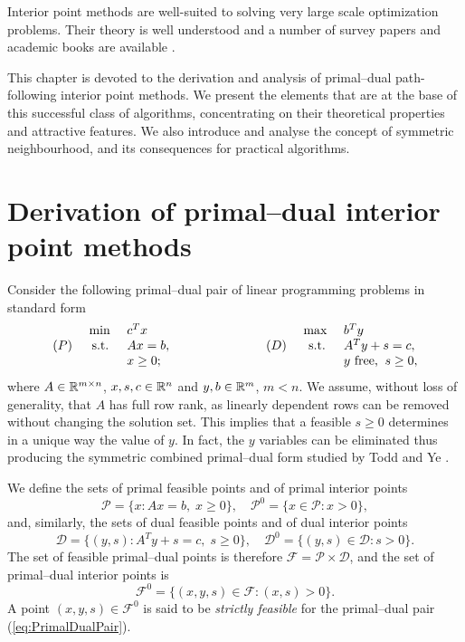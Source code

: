 
%
%
\label{ch:Ipm}

Interior point methods are well-suited to solving very
large scale optimization problems. Their theory is well understood
and a number of survey papers and academic books are available
\cite{AndersenGondzioMeszarosXu,GondzioTerlaky,Gonzaga92,
RoosTerlakyVial,MWright92,ipm:Wright97}.

This chapter is devoted to the derivation and analysis of primal--dual
path-following interior point methods. 
We present the elements that are at the base of this successful class
of algorithms, concentrating on their theoretical properties and
attractive features.
We also introduce and analyse the concept of symmetric neighbourhood,
and its consequences for practical algorithms.


%
%
\section{Derivation of primal--dual interior point methods}
\label{sec:Derivation}

Consider the following primal--dual pair of linear programming problems 
in standard form
%
\begin{eqnarray} \label{eq:PrimalDualPair}
  \begin{array}{crlp{2cm}crl}
     & \mbox{ min } & c^T x     &  &     & \mbox{ max }  & b^T y \\
 (P) &\mbox{ s.t. } & Ax = b,   &  & (D) & \mbox{ s.t. } & A^T y + s = c, \\
     &              & x \geq 0; &  &     &   & y \mbox{ free,} \;\; s \geq 0,
  \end{array}
\end{eqnarray}
%
where $A \in \mathbb{R}^{m \times n}$, $x, s, c \in \mathbb{R}^{n}$ 
and $y, b \in \mathbb{R}^{m}$, $m<n$. We assume, without loss of generality,
that $A$ has full row rank, as linearly dependent rows can be
removed without changing the solution set.
This implies that a feasible $s \ge 0$ determines in a unique
way the value of $y$.
In fact, the $y$ variables can be eliminated thus producing the
symmetric combined primal--dual form studied by Todd and Ye \cite{ToddYe90}.

We define the sets of primal feasible points and of
primal interior points 
\[
\mathcal{P} = \{ x : Ax = b, \; x \ge 0 \}, \quad
\mathcal{P}^0 = \{ x \in \mathcal{P} : x > 0 \},
\]
and, similarly, the sets of dual feasible points and of
dual interior points
\[
\mathcal{D} = \{ (y,s) : A^T y + s = c, \; s \ge 0 \}, \quad
\mathcal{D}^0 = \{ (y,s) \in \mathcal{D} : s > 0 \}.
\]
The set of feasible primal--dual points is therefore
$\mathcal{F} = \mathcal{P} \times \mathcal{D}$, and the set of primal--dual
interior points is
\[
\mathcal{F}^0 = \{ (x,y,s) \in \mathcal{F} : (x,s) > 0 \}.
\]
A point $(x,y,s) \in \mathcal{F}^0$ is said to be {\em strictly feasible}
for the primal--dual pair (\ref{eq:PrimalDualPair}).

